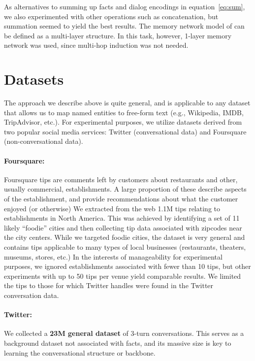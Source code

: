 \documentclass[letterpaper]{article}
\begin{document}
As alternatives to summing up facts and dialog encodings in equation~\ref{eq:sum}, we also experimented with other operations such as concatenation, but summation seemed to yield the best results.
The memory network model of \cite{weston2014} can be defined as a multi-layer structure.
In this task, however, 1-layer memory network was used, since multi-hop induction was not needed.

\section{Datasets}

The approach we describe above is quite general, and is applicable to any dataset that allows us to map named
entities to free-form text (e.g., Wikipedia, IMDB, TripAdvisor, etc.).
For experimental purposes, we utilize datasets derived from two popular social media services:
Twitter
 (conversational data) and
Foursquare
 (non-conversational data).

\paragraph{Foursquare:}
Foursquare tips are comments left by customers about restaurants and other, usually commercial, establishments.
A large proportion of these describe aspects of the establishment, and provide recommendations about what the customer enjoyed (or otherwise)
We extracted from the web 1.1M tips relating to establishments in North America.
This was achieved by identifying a set of 11 likely ``foodie'' cities and then collecting tip data associated with zipcodes near the city centers.
While we targeted foodie cities, the dataset is very general and contains tips applicable to many types of local businesses (restaurants, theaters, museums, stores, etc.)
In the interests of manageability for experimental purposes, we ignored establishments associated with fewer than 10 tips, but other experiments with up to 50 tips per venue yield comparable results.
We limited the tips to those for which Twitter handles were found in the Twitter conversation data.

\paragraph{Twitter:}
We collected a {\bf 23M general dataset}
of \mbox{3-turn} conversations.
This serves as a background dataset not associated with facts, and its massive size is key to learning the conversational structure or backbone.
\end{document}
